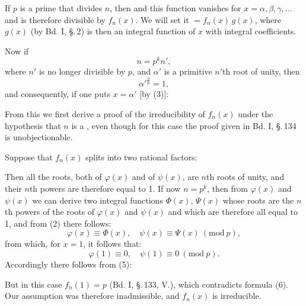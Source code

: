 
If $p$ is a prime that divides $n$, then
and this function vanishes for $x=\alpha, \beta, \gamma, \dots$ and is
therefore divisible by $f_n(x)$. We will set it $= f_n(x)\, g(x)$,
where $g(x)$ (by Bd. I, \S.\,2) is then an integral function of $x$
with integral coefficients.

Now if
\[
n = p^k n',
\]
where $n'$ is no longer divisible by $p$, and $\alpha'$ is a primitive $n'$th root of unity, then
\[
\alpha'^{\frac{n}{p}} = 1,
\]
and consequently, if one puts $x = \alpha'$ [by (3)]:

From this we first derive a proof of the irreducibility of $f_n(x)$ under the hypothesis that $n$ is a
, even though for this case the proof given in Bd. I,
\S.\,134 is unobjectionable.

Suppose that $f_n(x)$ splits into two rational factors:

Then all the roots, both of $\varphi(x)$ and of $\psi(x)$, are
$n$th roots of unity, and their $n$th powers are therefore equal to 1. If
now $n = p^k$, then from $\varphi(x)$ and $\psi(x)$ we can derive two integral
functions $\Phi(x)$, $\Psi(x)$ whose roots are the $n$th powers of the roots of $\varphi(x)$ and $\psi(x)$ and which are therefore all
equal to 1, and from (2) there follows:
\[
\varphi(x) \equiv \Phi(x), \quad \psi(x) \equiv \Psi(x) \ (\mathrm{mod}\ p),
\]
from which, for $x = 1$, it follows that:
\[
\varphi(1) \equiv 0, \quad \psi(1) \equiv 0 \ (\mathrm{mod}\ p).
\]
Accordingly there follows from (5):

But in this case $f_n(1) = p$ (Bd. I, \S.\,133, V.),
which contradicts formula (6). Our assumption was therefore
inadmissible, and $f_n(x)$ is irreducible.
